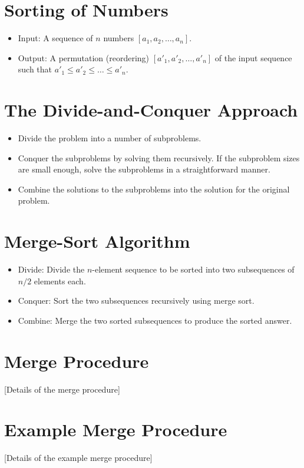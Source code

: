 \documentclass[12pt,openany]{book}
\theoremstyle{definition}
\begin{document}
	\section{Sorting of Numbers}
	\begin{itemize}
		\item Input: A sequence of \( n \) numbers \( [a_1, a_2, \ldots, a_n] \).
		\item Output: A permutation (reordering) \( [a'_1, a'_2, \ldots, a'_n] \) of the input sequence such that \( a'_1 \leq a'_2 \leq \ldots \leq a'_n \).
	\end{itemize}
	
	\section{The Divide-and-Conquer Approach}
	\begin{itemize}
		\item Divide the problem into a number of subproblems.
		\item Conquer the subproblems by solving them recursively. If the subproblem sizes are small enough, solve the subproblems in a straightforward manner.
		\item Combine the solutions to the subproblems into the solution for the original problem.
	\end{itemize}
	
	\section{Merge-Sort Algorithm}
	\begin{itemize}
		\item Divide: Divide the \( n \)-element sequence to be sorted into two subsequences of \( n/2 \) elements each.
		\item Conquer: Sort the two subsequences recursively using merge sort.
		\item Combine: Merge the two sorted subsequences to produce the sorted answer.
	\end{itemize}
	
	\section{Merge Procedure}
	[Details of the merge procedure]
	
	\section{Example Merge Procedure}
	[Details of the example merge procedure]
	
\end{document}
